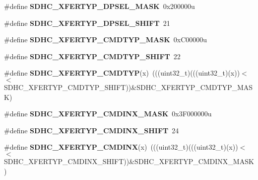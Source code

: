 \begin{DoxyCompactItemize}
\item 
\#define {\bfseries S\+D\+H\+C\+\_\+\+X\+F\+E\+R\+T\+Y\+P\+\_\+\+D\+P\+S\+E\+L\+\_\+\+M\+A\+SK}~0x200000u\hypertarget{group__SDHC__Register__Masks_ga3230581622fc9670367e7deaf2c3a95f}{}\label{group__SDHC__Register__Masks_ga3230581622fc9670367e7deaf2c3a95f}

\item 
\#define {\bfseries S\+D\+H\+C\+\_\+\+X\+F\+E\+R\+T\+Y\+P\+\_\+\+D\+P\+S\+E\+L\+\_\+\+S\+H\+I\+FT}~21\hypertarget{group__SDHC__Register__Masks_ga4de27d59ffd9269e2d4e9b61fa61eb5a}{}\label{group__SDHC__Register__Masks_ga4de27d59ffd9269e2d4e9b61fa61eb5a}

\item 
\#define {\bfseries S\+D\+H\+C\+\_\+\+X\+F\+E\+R\+T\+Y\+P\+\_\+\+C\+M\+D\+T\+Y\+P\+\_\+\+M\+A\+SK}~0x\+C00000u\hypertarget{group__SDHC__Register__Masks_gad4ea839bc838b6f865a31a7348910355}{}\label{group__SDHC__Register__Masks_gad4ea839bc838b6f865a31a7348910355}

\item 
\#define {\bfseries S\+D\+H\+C\+\_\+\+X\+F\+E\+R\+T\+Y\+P\+\_\+\+C\+M\+D\+T\+Y\+P\+\_\+\+S\+H\+I\+FT}~22\hypertarget{group__SDHC__Register__Masks_ga69a977a39e49c356bb10ec98ca77abdd}{}\label{group__SDHC__Register__Masks_ga69a977a39e49c356bb10ec98ca77abdd}

\item 
\#define {\bfseries S\+D\+H\+C\+\_\+\+X\+F\+E\+R\+T\+Y\+P\+\_\+\+C\+M\+D\+T\+YP}(x)~(((uint32\+\_\+t)(((uint32\+\_\+t)(x))$<$$<$S\+D\+H\+C\+\_\+\+X\+F\+E\+R\+T\+Y\+P\+\_\+\+C\+M\+D\+T\+Y\+P\+\_\+\+S\+H\+I\+FT))\&S\+D\+H\+C\+\_\+\+X\+F\+E\+R\+T\+Y\+P\+\_\+\+C\+M\+D\+T\+Y\+P\+\_\+\+M\+A\+SK)\hypertarget{group__SDHC__Register__Masks_ga15fa4ebd2c7d71184d2a734ae1ba37fa}{}\label{group__SDHC__Register__Masks_ga15fa4ebd2c7d71184d2a734ae1ba37fa}

\item 
\#define {\bfseries S\+D\+H\+C\+\_\+\+X\+F\+E\+R\+T\+Y\+P\+\_\+\+C\+M\+D\+I\+N\+X\+\_\+\+M\+A\+SK}~0x3\+F000000u\hypertarget{group__SDHC__Register__Masks_ga38c578078fbe7eae9b211d4e75eb9dd0}{}\label{group__SDHC__Register__Masks_ga38c578078fbe7eae9b211d4e75eb9dd0}

\item 
\#define {\bfseries S\+D\+H\+C\+\_\+\+X\+F\+E\+R\+T\+Y\+P\+\_\+\+C\+M\+D\+I\+N\+X\+\_\+\+S\+H\+I\+FT}~24\hypertarget{group__SDHC__Register__Masks_ga3ff92ff3a2de4c2006862e08e92198a2}{}\label{group__SDHC__Register__Masks_ga3ff92ff3a2de4c2006862e08e92198a2}

\item 
\#define {\bfseries S\+D\+H\+C\+\_\+\+X\+F\+E\+R\+T\+Y\+P\+\_\+\+C\+M\+D\+I\+NX}(x)~(((uint32\+\_\+t)(((uint32\+\_\+t)(x))$<$$<$S\+D\+H\+C\+\_\+\+X\+F\+E\+R\+T\+Y\+P\+\_\+\+C\+M\+D\+I\+N\+X\+\_\+\+S\+H\+I\+FT))\&S\+D\+H\+C\+\_\+\+X\+F\+E\+R\+T\+Y\+P\+\_\+\+C\+M\+D\+I\+N\+X\+\_\+\+M\+A\+SK)\hypertarget{group__SDHC__Register__Masks_ga14109a758d3ca3014df09696919ba77a}{}\label{group__SDHC__Register__Masks_ga14109a758d3ca3014df09696919ba77a}


\end{DoxyCompactItemize}
